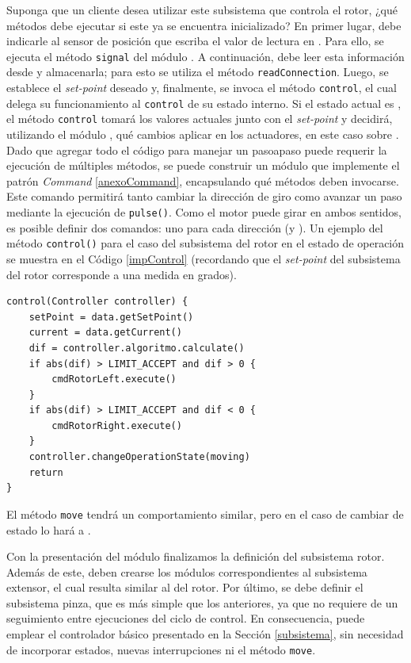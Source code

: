 Suponga que un cliente desea utilizar este subsistema que controla el rotor, ¿qué métodos debe ejecutar si este ya se encuentra inicializado?
En primer lugar, debe indicarle al sensor de posición que escriba el valor de lectura en \Pipe. Para ello, se ejecuta el método \verb|signal| del módulo \SensorPosRotor. A continuación, \RotorCtrl debe leer esta información desde \Pipe y almacenarla; para esto se utiliza el método \verb|readConnection|. Luego, se establece el \textit{set-point} deseado y, finalmente, se invoca el método \verb|control|, el cual delega su funcionamiento al \verb|control| de su estado interno. Si el estado actual es \Waiting, el método \verb|control| tomará los valores actuales junto con el \textit{set-point} y decidirá, utilizando el módulo \Algoritmo, qué cambios aplicar en los actuadores, en este caso sobre \Rotor. Dado que agregar todo el código para manejar un \gls{pasoapaso} puede requerir la ejecución de múltiples métodos, se puede construir un módulo que implemente el patrón \textit{Command} \ref{anexoCommand}, encapsulando qué métodos deben invocarse. Este comando permitirá tanto cambiar la dirección de giro como avanzar un paso mediante la ejecución de \verb|pulse()|. Como el motor puede girar en ambos sentidos, es posible definir dos comandos: uno para cada dirección (\CmdRotorLeft y \CmdRotorRight). Un ejemplo del método \verb|control()| para el caso del subsistema del rotor en el estado de operación \Waiting se muestra en el Código \ref{impControl} (recordando que el \textit{set-point} del subsistema del rotor corresponde a una medida en grados).

\begin{lstlisting}[caption=Ejemplo de implementación del método control del módulo Waiting.,label={impControl}]
control(Controller controller) {
    setPoint = data.getSetPoint()
    current = data.getCurrent()
    dif = controller.algoritmo.calculate()
    if abs(dif) > LIMIT_ACCEPT and dif > 0 {
        cmdRotorLeft.execute()
    }
    if abs(dif) > LIMIT_ACCEPT and dif < 0 {
        cmdRotorRight.execute()        
    }
    controller.changeOperationState(moving)
    return
}
\end{lstlisting}

El método \verb|move| tendrá un comportamiento similar, pero en el caso de cambiar de estado lo hará a \Waiting.

Con la presentación del módulo \RobotCtrl finalizamos la definición del subsistema rotor. Además de este, deben crearse los módulos correspondientes al subsistema extensor, el cual resulta similar al del rotor.
Por último, se debe definir el subsistema pinza, que es más simple que los anteriores, ya que no requiere de un seguimiento entre ejecuciones del ciclo de control. En consecuencia, puede emplear el controlador básico presentado en la Sección \ref{subsistema}, sin necesidad de incorporar estados, nuevas interrupciones ni el método \verb|move|.

